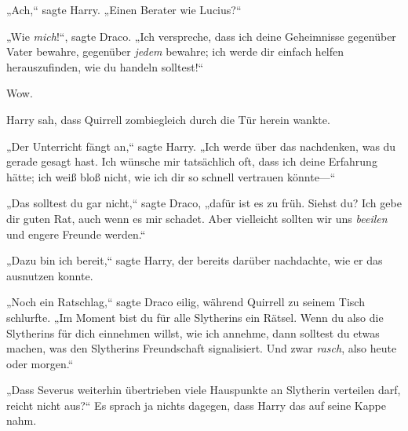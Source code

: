 „Ach,“ sagte Harry. „Einen Berater wie Lucius?“

„Wie \emph{mich}!“, sagte Draco. „Ich verspreche, dass ich deine Geheimnisse gegenüber Vater bewahre, gegenüber \emph{jedem} bewahre; ich werde dir einfach helfen herauszufinden, wie du handeln solltest!“

Wow.

Harry sah, dass Quirrell zombiegleich durch die Tür herein wankte.

„Der Unterricht fängt an,“ sagte Harry. „Ich werde über das nachdenken, was du gerade gesagt hast. Ich wünsche mir tatsächlich oft, dass ich deine Erfahrung hätte; ich weiß bloß nicht, wie ich dir so schnell vertrauen könnte—“

„Das solltest du gar nicht,“ sagte Draco, „dafür ist es zu früh. Siehst du? Ich gebe dir guten Rat, auch wenn es mir schadet. Aber vielleicht sollten wir uns \emph{beeilen} und engere Freunde werden.“

„Dazu bin ich bereit,“ sagte Harry, der bereits darüber nachdachte, wie er das ausnutzen konnte.

„Noch ein Ratschlag,“ sagte Draco eilig, während Quirrell zu seinem Tisch schlurfte. „Im Moment bist du für alle Slytherins ein Rätsel. Wenn du also die Slytherins für dich einnehmen willst, wie ich annehme, dann solltest du etwas machen, was den Slytherins Freundschaft signalisiert. Und zwar \emph{rasch}, also heute oder morgen.“

„Dass Severus weiterhin übertrieben viele Hauspunkte an Slytherin verteilen darf, reicht nicht aus?“ Es sprach ja nichts dagegen, dass Harry das auf seine Kappe nahm.

